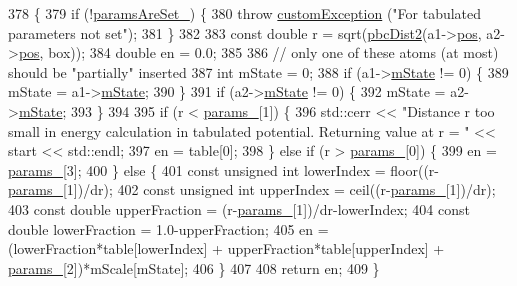 \begin{DoxyCode}
378                                                                                          \{
379     \textcolor{keywordflow}{if} (!\hyperlink{classpair_potential_a635755c0a952bfc05a4cfae230c3dbd2}{paramsAreSet\_}) \{
380         \textcolor{keywordflow}{throw} \hyperlink{classcustom_exception}{customException} (\textcolor{stringliteral}{"For tabulated parameters not set"});
381     \}
382 
383     \textcolor{keyword}{const} \textcolor{keywordtype}{double} r = sqrt(\hyperlink{utilities_8cpp_abb1db3a8a3ac46e044bbe7b2c5684c0a}{pbcDist2}(a1->\hyperlink{classatom_a3ae5f4880e7831d8b2c9fda72b4eb24a}{pos}, a2->\hyperlink{classatom_a3ae5f4880e7831d8b2c9fda72b4eb24a}{pos}, box));
384     \textcolor{keywordtype}{double} en = 0.0;
385 
386     \textcolor{comment}{// only one of these atoms (at most) should be "partially" inserted}
387     \textcolor{keywordtype}{int} mState = 0;
388     \textcolor{keywordflow}{if} (a1->\hyperlink{classatom_a3cb00c0c5b7533657e05af6ff4a42740}{mState} != 0) \{
389         mState = a1->\hyperlink{classatom_a3cb00c0c5b7533657e05af6ff4a42740}{mState};
390     \}
391     \textcolor{keywordflow}{if} (a2->\hyperlink{classatom_a3cb00c0c5b7533657e05af6ff4a42740}{mState} != 0) \{
392         mState = a2->\hyperlink{classatom_a3cb00c0c5b7533657e05af6ff4a42740}{mState};
393     \}
394 
395     \textcolor{keywordflow}{if} (r < \hyperlink{classpair_potential_abf8ec8af983d6e9960bd149da099e883}{params\_}[1]) \{
396         std::cerr << \textcolor{stringliteral}{"Distance r too small in energy calculation in tabulated potential. Returning value at
       r = "} << start << std::endl;
397         en = table[0];
398     \} \textcolor{keywordflow}{else} \textcolor{keywordflow}{if} (r > \hyperlink{classpair_potential_abf8ec8af983d6e9960bd149da099e883}{params\_}[0]) \{
399         en = \hyperlink{classpair_potential_abf8ec8af983d6e9960bd149da099e883}{params\_}[3];
400     \} \textcolor{keywordflow}{else} \{
401         \textcolor{keyword}{const} \textcolor{keywordtype}{unsigned} \textcolor{keywordtype}{int} lowerIndex = floor((r-\hyperlink{classpair_potential_abf8ec8af983d6e9960bd149da099e883}{params\_}[1])/dr);
402         \textcolor{keyword}{const} \textcolor{keywordtype}{unsigned} \textcolor{keywordtype}{int} upperIndex = ceil((r-\hyperlink{classpair_potential_abf8ec8af983d6e9960bd149da099e883}{params\_}[1])/dr);
403         \textcolor{keyword}{const} \textcolor{keywordtype}{double} upperFraction = (r-\hyperlink{classpair_potential_abf8ec8af983d6e9960bd149da099e883}{params\_}[1])/dr-lowerIndex;
404         \textcolor{keyword}{const} \textcolor{keywordtype}{double} lowerFraction = 1.0-upperFraction;
405         en = (lowerFraction*table[lowerIndex] + upperFraction*table[upperIndex] + 
      \hyperlink{classpair_potential_abf8ec8af983d6e9960bd149da099e883}{params\_}[2])*mScale[mState];
406     \}
407 
408     \textcolor{keywordflow}{return} en;
409 \}
\end{DoxyCode}
